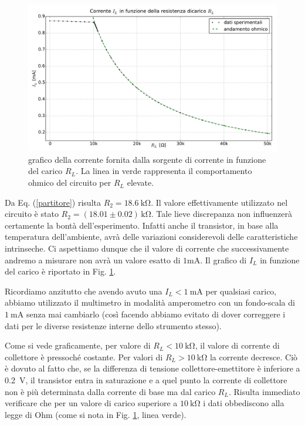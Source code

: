\begin{figure}[H]
\centering
	\includegraphics[scale=0.45]{sorgente.pdf}
	\caption{grafico della corrente fornita dalla sorgente di corrente in funzione del carico $R_L$. La linea in verde rappresenta il comportamento ohmico del circuito per $R_L$ elevate.}
	\label{fig:sorg}
\end{figure}

Da Eq. (\ref{partitore}) risulta $R_2 = \SI{18.6}{\kilo\ohm} $.
Il valore effettivamente utilizzato nel circuito è stato $R_2 = (18.01 \pm 0.02 )\,\si{\kilo\ohm} $.
Tale lieve discrepanza non influenzerà certamente la bontà dell'esperimento.
Infatti anche il transistor, in base alla temperatura dell'ambiente, avrà delle variazioni considerevoli delle caratteristiche intrinseche.
Ci aspettiamo dunque che il valore di corrente che successivamente andremo a misurare non avrà un valore esatto di $1\si{\milli\ampere}$. 
Il grafico di $I_L$ in funzione del carico è riportato in Fig. \ref{fig:sorg}.

Ricordiamo anzitutto che avendo avuto una $I_L<\SI{1}{\milli\ampere}$ per qualsiasi carico, abbiamo utilizzato il multimetro in modalità amperometro con un fondo-scala di $\SI{1}{\milli\ampere}$ senza mai cambiarlo (così facendo abbiamo evitato di dover correggere i dati per le diverse resistenze interne dello strumento stesso).

Come si vede graficamente, per valore di $R_L<\SI{10}{\kilo\ohm}$, il valore di corrente di collettore è pressoché costante.
Per valori di $R_L>\SI{10}{\kilo\ohm}$ la corrente decresce.
Ciò è dovuto al fatto che, se la differenza di tensione collettore-emettitore è inferiore a \SI{0.2}{\volt}, il transistor entra in saturazione e a quel punto la corrente di  collettore non è più determinata dalla corrente di base ma dal carico $R_L$.
Risulta immediato verificare che  per un valore di carico superiore a $\SI{10}{\kilo\ohm}$ i dati obbediscono alla legge di Ohm (come si nota in Fig. \ref{fig:sorg}, linea verde).

